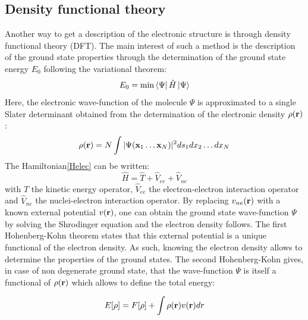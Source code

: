 \documentclass[12pt]{report}
\numberwithin{equation}{section}
\begin{document}
\subsection{Density functional theory}

Another way to get a description of the electronic structure is through density functional theory (DFT).
The main interest of such a method is the description of the ground state properties through the determination of the ground state energy $E_0$ following the variational theorem:
\begin{equation}
    E_0 = \min \bra{\Psi} \hat{H} \ket{\Psi}
\end{equation}
Here, the electronic wave-function of the molecule $\Psi$ is approximated to a single Slater determinant obtained from the determination of the electronic density $\rho(\vb r)$:
\begin{equation}
    \rho(\vb r)=N\int |\Psi(\vb x_1 \ldots \vb x_N)|^2 ds_1 dx_2 \ldots dx_N
\end{equation}
The Hamiltonian\ref{Helec} can be written:
\begin{equation}\label{Hop}
    \hat{H}=\hat{T} + \hat{V}_{ee} + \hat{V}_{ne}
\end{equation} 
with $\hat{T}$ the kinetic energy operator, $\hat{V}_{ee}$ the electron-electron interaction operator and $\hat{V}_{ne}$ the nuclei-electron interaction operator. 
By replacing $v_{ne}(\vb r)$ with a known external potential $v(\vb r)$, one can obtain the ground state wave-function $\Psi$ by solving the Shrodinger equation and the electron density follows.
The first Hohenberg-Kohn theorem states that this external potential is a unique functional of the electron density.
As such, knowing the electron density allows to determine the properties of the ground states.
The second Hohenberg-Kohn gives, in case of non degenerate ground state, that the wave-function $\Psi$ is itself a functional of $\rho(\vb r)$ which allows to define the total energy:

\begin{equation}\label{EnergyDFT}
    E[\rho]= F[\rho]+ \int \rho(\vb r) v(\vb r)dr
\end{equation}
\end{document}
